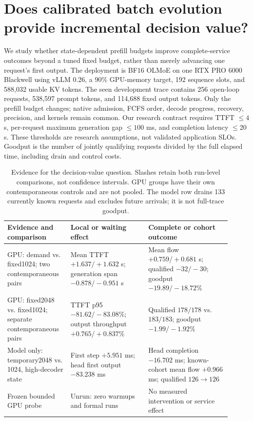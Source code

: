 \section{Does calibrated batch evolution provide incremental decision value?}
\label{sec:d-calibrated-decision}

We study whether state-dependent prefill budgets improve complete-service
outcomes beyond a tuned fixed budget, rather than merely advancing one request's
first output. The deployment is BF16 OLMoE on one RTX PRO 6000 Blackwell using
vLLM 0.26, a 90\% GPU-memory target, 192 sequence slots, and 588,032 usable KV
tokens. The seen development trace contains 256 open-loop requests, 538,597
prompt tokens, and 114,688 fixed output tokens. Only the prefill budget changes;
native admission, FCFS order, decode progress, recovery, precision, and kernels
remain common. Our research contract requires TTFT $\leq4$ s, per-request maximum
generation gap $\leq100$ ms, and completion latency $\leq20$ s. These thresholds
are research assumptions, not validated application SLOs. Goodput is the number
of jointly qualifying requests divided by the full elapsed time, including drain
and control costs.

\begin{table}[ht]
\centering\small
\begin{tabular}{p{0.25\linewidth}p{0.32\linewidth}p{0.34\linewidth}}
\toprule
Evidence and comparison & Local or waiting effect & Complete or cohort outcome \\
\midrule
GPU: demand vs. fixed1024; two contemporaneous pairs
& Mean TTFT $+1.637/+1.632$ s; generation span $-0.878/-0.951$ s
& Mean flow $+0.759/+0.681$ s; qualified $-32/-30$; goodput $-19.89/-18.72\%$ \\
GPU: fixed2048 vs. fixed1024; separate contemporaneous pairs
& TTFT p95 $-81.62/-83.08\%$; output throughput $+0.765/+0.837\%$
& Qualified $178/178$ vs. $183/183$; goodput $-1.99/-1.92\%$ \\
Model only: temporary2048 vs. 1024, high-decoder state
& First step $+5.951$ ms; head first output $-83.238$ ms
& Head completion $-16.702$ ms; known-cohort mean flow $+0.966$ ms; qualified $126\to126$ \\
Frozen bounded GPU probe
& Unrun: zero warmups and formal runs
& No measured intervention or service effect \\
\bottomrule
\end{tabular}
\caption{Evidence for the decision-value question. Slashes retain both
run-level comparisons, not confidence intervals. GPU groups have their own
contemporaneous controls and are not pooled. The model row drains 133 currently
known requests and excludes future arrivals; it is not full-trace goodput.}
\label{tab:d-decision-value}
\end{table}

